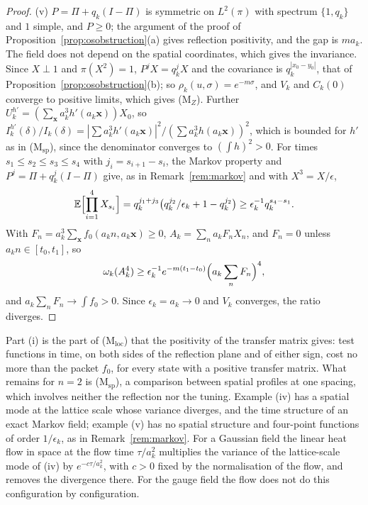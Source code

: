 \documentclass[aps,prd,twocolumn,superscriptaddress,nofootinbib,longbibliography,floatfix,amsmath,amssymb,10pt]{revtex4-2}
\theoremstyle{definition}
\theoremstyle{remark}
\newcommand{\E}{\mathbb{E}}
\begin{document}
\begin{proof}
(v) $P=\Pi+q_k(I-\Pi)$ is symmetric on $L^2(\pi)$ with spectrum
$\{1,q_k\}$ and $1$ simple, and $P\ge0$; the argument of the proof of
Proposition~\ref{prop:osobstruction}(a) gives reflection positivity, and the
gap is $ma_k$. The field does not depend on the spatial coordinates, which
gives the invariance. Since $X\perp1$ and $\pi(X^2)=1$, $P^jX=q_k^jX$ and
the covariance is $q_k^{|x_0-y_0|}$, that of
Proposition~\ref{prop:osobstruction}(b); so $\rho_k(u,\sigma)=e^{-m\sigma}$,
and $V_k$ and $C_k(0)$ converge to positive limits, which gives (M$_Z$).
Further $U^{h'}_k=(\sum_{\mathbf x}a_k^3h'(a_k\mathbf x))X_0$, so
$I^{h'}_k(\delta)/I_k(\delta)=|\sum a_k^3h'(a_k\mathbf x)|^2/(\sum a_k^3
h(a_k\mathbf x))^2$, which is bounded for $h'$ as in (M$_{\mathrm{sp}}$),
since the denominator converges to $(\int h)^2>0$. For times $s_1\le s_2\le
s_3\le s_4$ with $j_i=s_{i+1}-s_i$, the Markov property and $P^j=\Pi+
q_k^j(I-\Pi)$ give, as in Remark~\ref{rem:markov} and with $X^3=X/\epsilon$,
\[
\E\Bigl[\prod_{i=1}^4X_{s_i}\Bigr]=q_k^{j_1+j_3}\bigl(q_k^{j_2}/\epsilon_k
+1-q_k^{j_2}\bigr)\ge\epsilon_k^{-1}q_k^{s_4-s_1} .
\]
With $F_n=a_k^3\sum_{\mathbf x}f_0(a_kn,a_k\mathbf x)\ge0$, $A_k=\sum_n
a_kF_nX_n$, and $F_n=0$ unless $a_kn\in[t_0,t_1]$, so
\[
\omega_k(A_k^4)\ge\epsilon_k^{-1}e^{-m(t_1-t_0)}\Bigl(a_k\sum_nF_n\Bigr)^4 ,
\]
and $a_k\sum_nF_n\to\int f_0>0$. Since $\epsilon_k=a_k\to0$ and $V_k$
converges, the ratio diverges.
\end{proof}

Part (i) is the part of (M$_{\mathrm{loc}}$) that the positivity of the
transfer matrix gives: test functions in time, on both sides of the
reflection plane and of either sign, cost no more than the packet $f_0$, for
every state with a positive transfer matrix. What remains for $n=2$ is
(M$_{\mathrm{sp}}$), a comparison between spatial profiles at one spacing,
which involves neither the reflection nor the tuning. Example (iv) has a
spatial mode at the lattice scale whose variance diverges, and the time
structure of an exact Markov field; example (v) has no spatial structure
and four-point functions of order $1/\epsilon_k$, as in
Remark~\ref{rem:markov}. For a Gaussian field the linear heat flow in space at the flow time
$\tau/a_k^2$ multiplies the variance of the lattice-scale mode of (iv) by
$e^{-c\tau/a_k^2}$, with $c>0$ fixed by the normalisation of the flow, and
removes the divergence there. For the gauge field the flow does not do this
configuration by configuration.
\end{document}

